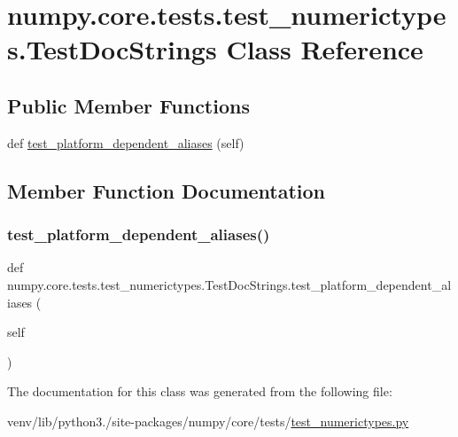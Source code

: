 \hypertarget{classnumpy_1_1core_1_1tests_1_1test__numerictypes_1_1TestDocStrings}{}\section{numpy.\+core.\+tests.\+test\+\_\+numerictypes.\+Test\+Doc\+Strings Class Reference}
\label{classnumpy_1_1core_1_1tests_1_1test__numerictypes_1_1TestDocStrings}
\subsection*{Public Member Functions}
\begin{DoxyCompactItemize}
\item 
def \hyperlink{classnumpy_1_1core_1_1tests_1_1test__numerictypes_1_1TestDocStrings_ad6b3bcb5da2f8ef38ad4baa86f9fbfcc}{test\+\_\+platform\+\_\+dependent\+\_\+aliases} (self)
\end{DoxyCompactItemize}


\subsection{Member Function Documentation}
\mbox{\label{classnumpy_1_1core_1_1tests_1_1test__numerictypes_1_1TestDocStrings_ad6b3bcb5da2f8ef38ad4baa86f9fbfcc}} 
\subsubsection{\texorpdfstring{test\+\_\+platform\+\_\+dependent\+\_\+aliases()}{test\_platform\_dependent\_aliases()}}
{\footnotesize\ttfamily def numpy.\+core.\+tests.\+test\+\_\+numerictypes.\+Test\+Doc\+Strings.\+test\+\_\+platform\+\_\+dependent\+\_\+aliases (\begin{DoxyParamCaption}\item[{}]{self }\end{DoxyParamCaption})}



The documentation for this class was generated from the following file\+:\begin{DoxyCompactItemize}
\item 
venv/lib/python3./site-\/packages/numpy/core/tests/\hyperlink{test__numerictypes_8py}{test\+\_\+numerictypes.\+py}\end{DoxyCompactItemize}
